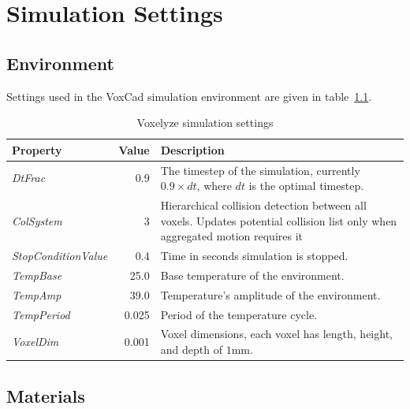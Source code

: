 \chapter{Simulation Settings} %
\label{SimulationSettings} %



\section{Environment}
Settings used in the VoxCad simulation environment are given in table~\ref{VoxelyzeSimulationSettings}.

\begin{table}[ht!]
\centering
\caption{Voxelyze simulation settings}
\label{VoxelyzeSimulationSettings}
    \begin{tabular}{l r p{9cm}}
    \toprule
    \textbf{Property} & \textbf{Value} & \textbf{Description}\\
    \midrule
    \emph{DtFrac} & 0.9 & The timestep of the simulation, currently $0.9 \times dt$, where $dt$ is the optimal timestep.\\
    \emph{ColSystem}        & 3 & Hierarchical collision detection between all voxels. Updates potential collision list only when aggregated motion requires it\footnote.\\
    \emph{StopConditionValue} & 0.4 & Time in seconds simulation is stopped.\\
    \emph{TempBase} & 25.0 & Base temperature of the environment.\\
    \emph{TempAmp} & 39.0 & Temperature's amplitude of the environment.\\
    \emph{TempPeriod} & 0.025 & Period of the temperature cycle.\\
    \emph{VoxelDim} & 0.001 & Voxel dimensions, each voxel has length, height, and depth of $1$mm.\\
    \bottomrule
    \end{tabular}
\end{table}




\section{Materials}


